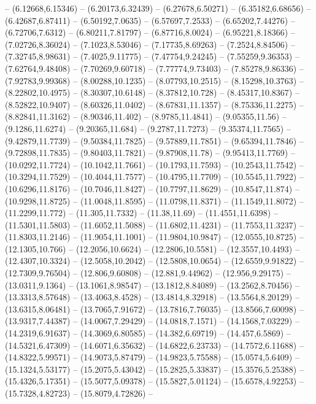 {  -- (6.12668,6.15346) -- (6.20173,6.32439) -- (6.27678,6.50271) -- (6.35182,6.68656) -- (6.42687,6.87411) -- (6.50192,7.0635) -- (6.57697,7.2533) -- (6.65202,7.44276) -- (6.72706,7.6312) -- (6.80211,7.81797) -- (6.87716,8.0024) -- (6.95221,8.18366)
  -- (7.02726,8.36024) -- (7.1023,8.53046) -- (7.17735,8.69263) -- (7.2524,8.84506) -- (7.32745,8.98631) -- (7.4025,9.11775) -- (7.47754,9.24245) -- (7.55259,9.36353) -- (7.62764,9.48408) -- (7.70269,9.60718) -- (7.77774,9.73403) -- (7.85278,9.86336)
  -- (7.92783,9.99368) -- (8.00288,10.1235) -- (8.07793,10.2515) -- (8.15298,10.3763) -- (8.22802,10.4975) -- (8.30307,10.6148) -- (8.37812,10.728) -- (8.45317,10.8367) -- (8.52822,10.9407) -- (8.60326,11.0402) -- (8.67831,11.1357) --
  (8.75336,11.2275) -- (8.82841,11.3162) -- (8.90346,11.402) -- (8.9785,11.4841) -- (9.05355,11.56) -- (9.1286,11.6274) -- (9.20365,11.684) -- (9.2787,11.7273) -- (9.35374,11.7565) -- (9.42879,11.7739) -- (9.50384,11.7825) -- (9.57889,11.7851) --
  (9.65394,11.7846) -- (9.72898,11.7835) -- (9.80403,11.7821) -- (9.87908,11.78) -- (9.95413,11.7769) -- (10.0292,11.7724) -- (10.1042,11.7661) -- (10.1793,11.7593) -- (10.2543,11.7542) -- (10.3294,11.7529) -- (10.4044,11.7577) -- (10.4795,11.7709) --
  (10.5545,11.7922) -- (10.6296,11.8176) -- (10.7046,11.8427) -- (10.7797,11.8629) -- (10.8547,11.874) -- (10.9298,11.8725) -- (11.0048,11.8595) -- (11.0798,11.8371) -- (11.1549,11.8072) -- (11.2299,11.772) -- (11.305,11.7332) -- (11.38,11.69) --
  (11.4551,11.6398) -- (11.5301,11.5803) -- (11.6052,11.5088) -- (11.6802,11.4231) -- (11.7553,11.3237) -- (11.8303,11.2146) -- (11.9054,11.1001) -- (11.9804,10.9847) -- (12.0555,10.8725) -- (12.1305,10.766) -- (12.2056,10.6624) -- (12.2806,10.5581)
  -- (12.3557,10.4493) -- (12.4307,10.3324) -- (12.5058,10.2042) -- (12.5808,10.0654) -- (12.6559,9.91822) -- (12.7309,9.76504) -- (12.806,9.60808) -- (12.881,9.44962) -- (12.956,9.29175) -- (13.0311,9.1364) -- (13.1061,8.98547) -- (13.1812,8.84089)
  -- (13.2562,8.70456) -- (13.3313,8.57648) -- (13.4063,8.4528) -- (13.4814,8.32918) -- (13.5564,8.20129) -- (13.6315,8.06481) -- (13.7065,7.91672) -- (13.7816,7.76035) -- (13.8566,7.60098) -- (13.9317,7.44387) -- (14.0067,7.29429) -- (14.0818,7.1571)
  -- (14.1568,7.03229) -- (14.2319,6.91637) -- (14.3069,6.80585) -- (14.382,6.69719) -- (14.457,6.5869) -- (14.5321,6.47309) -- (14.6071,6.35632) -- (14.6822,6.23733) -- (14.7572,6.11688) -- (14.8322,5.99571) -- (14.9073,5.87479) -- (14.9823,5.75588)
  -- (15.0574,5.6409) -- (15.1324,5.53177) -- (15.2075,5.43042) -- (15.2825,5.33837) -- (15.3576,5.25388) -- (15.4326,5.17351) -- (15.5077,5.09378) -- (15.5827,5.01124) -- (15.6578,4.92253) -- (15.7328,4.82723) -- (15.8079,4.72826) --
}
